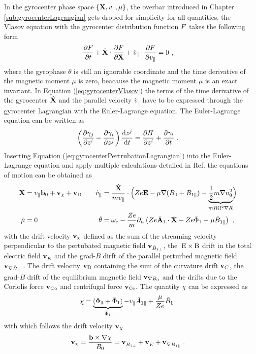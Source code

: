 In the gyrocenter phase space $\{\boldsymbol{\mathbf{X}}, v_\parallel, \mu\}$, the overbar introduced in Chapter \ref{sub:gyrocenterLagrangian} gets droped for simplicity for all quantities, the Vlasov equation with the gyrocenter distribution function $F$ takes the following form
\begin{gather}
	\frac{\partial F}{\partial t} + \dot{\boldsymbol{\mathbf{X}}} \cdot \frac{\partial F}{\partial \boldsymbol{\mathbf{X}}} + \dot{v}_\parallel \cdot \frac{\partial F}{\partial v_\parallel} = 0~,
	\label{eq:gyrocenterVlasov}
\end{gather}
where the gyrophase $\theta$ is still an ignorable coordinate and the time derivative of the magnetic moment $\mu$ is zero, beacause the magnetic moment $\mu$ is an exact invariant. In Equation (\ref{eq:gyrocenterVlasov}) the terms of the time derivative of the gyrocenter $\dot{\boldsymbol{\mathbf{X}}}$ and the parallel velocity $\dot{v_\parallel}$ have to be expressed through the gyrocenter Lagrangian with the Euler-Lagrange equation. The Euler-Lagrange equation can be written as 
\begin{gather}
	\left(\frac{\partial \gamma_j}{\partial z^i} - \frac{\partial \gamma_i}{\partial z^j}\right) \frac{\mathrm{d}z^j}{\mathrm{d}t} = \frac{\partial H}{\partial z^i} + \frac{\partial \gamma_i}{\partial t}~.
	\label{eq:eulerLagrange}
\end{gather}
Inserting Equation (\ref{eq:gyrocenterPertrubationLagrangian}) into the Euler-Lagrange equation and apply multiple calculations detailed in Ref.  the equations of motion can be obtained as
\begin{gather}
	\begin{aligned}
		\dot{\boldsymbol{\mathbf{X}}} &= v_\parallel\boldsymbol{\mathbf{b}}_0 + \boldsymbol{\mathbf{v}}_\chi + \boldsymbol{\mathbf{v}}_\mathrm{D} &\quad \dot{v}_\parallel &= \frac{\dot{\boldsymbol{\mathbf{X}}}}{mv_\parallel} \cdot \Bigl( Ze \bar{\boldsymbol{\mathbf{E}}} -\mu\nabla (B_0 + \bar{B}_{1\parallel}) + \underbrace{\frac{1}{2} m \nabla u_0^2}_{mR \Omega^2 \nabla R} \Bigr) \\
		\dot{\mu} &= 0  &\quad \dot{\theta} &= \omega_\mathrm{c} - \frac{Ze}{m} \partial_\mu \left(Ze\bar{\boldsymbol{\mathbf{A}}}_1 \cdot \dot{\boldsymbol{\mathbf{X}}} - Ze\bar{\Phi}_1 - \mu\bar{B}_{1\parallel}\right)~,
	\end{aligned}
	\label{eq:motionEquation}
\end{gather}
with the drift velocity $\boldsymbol{\mathbf{v}}_\chi$ defined as the sum of the streaming velocity perpendicular to the pertubated magnetic field $\boldsymbol{\mathbf{v}}_{\bar{B}_{1\perp}}$, the $\mathrm{\:E}\times\mathrm{B}$ drift in the total electric field $\boldsymbol{\mathbf{v}}_{\bar{E}}$ and the grad-$B$ dirft of the parallel perturbed magnetic field $\boldsymbol{\mathbf{v}}_{\nabla \bar{B}_{1\parallel}}$. The drift velocity $\boldsymbol{\mathbf{v}}_\mathrm{D}$ containing the sum of the curvature drift $\boldsymbol{\mathbf{v}}_C$, the grad-$B$ drift of the equilibrium magnetic field $\boldsymbol{\mathbf{v}}_{\nabla B_0}$ and the drifts due to the Coriolis force $\boldsymbol{\mathbf{v}}_\mathrm{Co}$ and centrifugal force $\boldsymbol{\mathbf{v}}_\mathrm{Ce}$. The quantity $\chi$ can be expressed as
\begin{gather}
	\chi = \underbrace{(\Phi_0 + \bar{\Phi}_1)}_{\bar{\Phi}_1} - v_\parallel \bar{A}_{1\parallel} + \frac{\mu}{Ze} \bar{B}_{1\parallel}
	\label{eq:driftPotential}
\end{gather}
with which follows the drift velocity $\boldsymbol{\mathbf{v}}_\chi$ 
\begin{gather}
	\boldsymbol{\mathbf{v}}_\chi = \frac{\boldsymbol{\mathbf{b}} \times \nabla \chi}{B_0} = \boldsymbol{\mathbf{v}}_{\bar{B}_{1\perp}} + \boldsymbol{\mathbf{v}}_{\bar{E}} + \boldsymbol{\mathbf{v}}_{\nabla \bar{B}_{1\parallel}}~.
	\label{eq:veloDriftPotential}
\end{gather}
\bigskip

